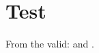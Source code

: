 \documentclass[a4paper,10pt]{article}
\begin{document}
\section{Test}

From the valid: \cite{most09complete} and
\cite{just08anid,one07author,minimal07working}.






 
\end{document}
